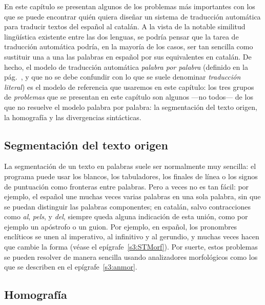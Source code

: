 En este capítulo se presentan algunos de los problemas más importantes con los que se puede encontrar quién quiera diseñar un sistema de traducción automática para traducir textos del español al catalán. A la vista de la notable similitud lingüística existente entre las dos lenguas, se podría pensar que la tarea de traducción automática podría, en la mayoría de los casos, ser tan sencilla como sustituir una a una las palabras en español por sus equivalentes en catalán. De hecho, el modelo de traducción automática \emph{palabra por palabra} (definido en la pág.~\pageref{pg:mpm}, y que no se debe confundir con lo que se suele denominar \emph{traducción literal}) es el modelo de referencia que usaremos en este capítulo: los tres grupos de {\em problemas} que se presentan en este capítulo son algunos ---no todos--- de los que no resuelve el modelo palabra por palabra: la segmentación del texto origen, la homografía y las divergencias sintácticas. 

\subsection{Segmentación del texto origen} 

La segmentación de un texto en palabras suele ser normalmente muy sencilla: el programa puede usar los blancos, los tabuladores, los finales de línea o los signos de puntuación como fronteras entre palabras. Pero a veces no es tan fácil: por ejemplo, el español une muchas veces varias palabras en una sola palabra, sin que se  puedan distinguir las palabras componentes; en catalán, salvo contracciones como \emph{al}, \emph{pels}, y \emph{del}, siempre queda alguna indicación de esta unión, como por ejemplo un apóstrofo o un guion. Por ejemplo, en español, los pronombres enclíticos se unen al imperativo, al infinitivo y al gerundio, y muchas veces hacen que  cambie la forma (véase el epígrafe~\ref{s3:STMorf}). Por suerte, estos problemas se pueden resolver de manera sencilla usando analizadores morfológicos como los que se describen en el epígrafe~\ref{s3:anmor}. 

\subsection{Homografía} 

